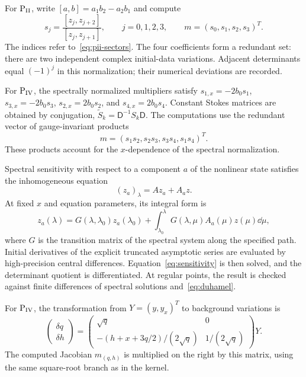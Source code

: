 For $\mathrm{P}_{\mathrm{II}}$, write $[a,b]=a_1b_2-a_2b_1$ and compute
\begin{equation*}
 s_j=\frac{[z_j,z_{j+2}]}{[z_j,z_{j+1}]},\qquad j=0,1,2,3,
 \qquad m=(s_0,s_1,s_2,s_3)^T.
\end{equation*}
The indices refer to~\eqref{eq:pii-sectors}.
The four coefficients form a redundant set: there are two independent
complex initial-data variations. Adjacent determinants equal $(-1)^j$
in this normalization; their numerical deviations are recorded.

For $\mathrm{P}_{\mathrm{IV}}$, the spectrally normalized multipliers satisfy
$s_{1,x}=-2b_0s_1$, $s_{3,x}=-2b_0s_3$,
$s_{2,x}=2b_0s_2$, and $s_{4,x}=2b_0s_4$.
Constant Stokes matrices are obtained by conjugation,
$\widetilde S_k=\mathsf D^{-1}S_k\mathsf D$.
The computations use the redundant vector of gauge-invariant products
\begin{equation*}
 m=(s_1s_2,s_2s_3,s_3s_4,s_1s_4)^T.
\end{equation*}
These products account for the $x$-dependence of the spectral normalization.

Spectral sensitivity with respect to a component $a$ of the nonlinear
state satisfies the inhomogeneous equation
\begin{equation}\label{eq:sensitivity}
 (z_a)_\lambda=A z_a+A_a z.
\end{equation}
At fixed $x$ and equation parameters, its integral form is
\begin{equation}\label{eq:duhamel}
 z_a(\lambda)=G(\lambda,\lambda_0)z_a(\lambda_0)
 +\int_{\lambda_0}^{\lambda}G(\lambda,\mu)A_a(\mu)z(\mu)\dd\mu,
\end{equation}
where $G$ is the transition matrix of the spectral system along the
specified path. Initial derivatives of the explicit truncated asymptotic
series are evaluated by high-precision central differences.
Equation~\eqref{eq:sensitivity} is then solved, and the determinant
quotient is differentiated. At regular points, the result is checked
against finite differences of spectral solutions and~\eqref{eq:duhamel}.

For $\mathrm{P}_{\mathrm{IV}}$, the transformation from $Y=(y,y_x)^T$ to background
variations is
\begin{equation*}
 \begin{pmatrix}\delta q\\\delta h\end{pmatrix}
 =\begin{pmatrix}
 \sqrt q&0\\
 -(h+x+3q/2)/(2\sqrt q)&1/(2\sqrt q)
 \end{pmatrix}Y.
\end{equation*}
The computed Jacobian $m_{(q,h)}$ is multiplied on the right by this
matrix, using the same square-root branch as in the kernel.

